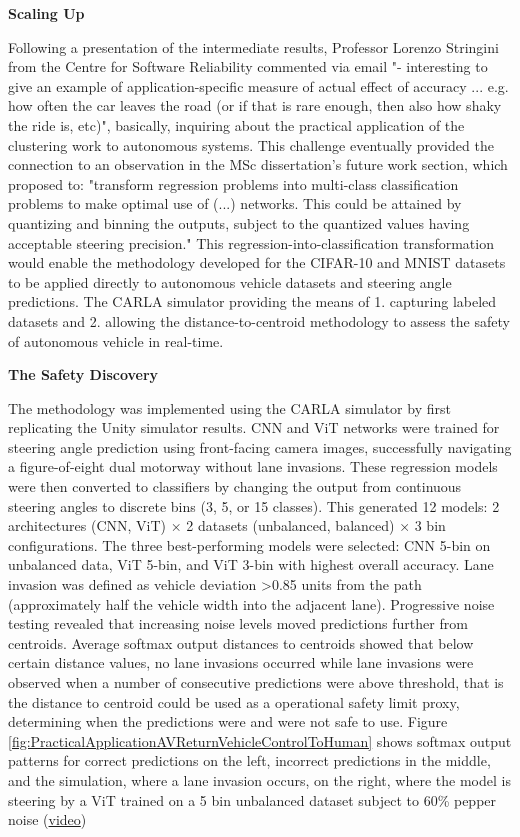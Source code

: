 \textbf{Scaling Up}

Following a presentation of the intermediate results, Professor Lorenzo Stringini from the Centre for Software Reliability commented via email "- interesting to give an example of application-specific measure of actual effect of accuracy ... e.g. how often the car leaves the road (or if that is rare enough, then also how shaky the ride is, etc)", basically, inquiring about the practical application of the clustering work to autonomous systems. This challenge eventually provided the connection to an observation in the MSc dissertation's future work section, which proposed to: "transform regression problems into multi-class classification problems to make optimal use of (...) networks. This could be attained by quantizing and binning the outputs, subject to the quantized values having acceptable steering precision."
This regression-into-classification transformation would enable the methodology developed for the CIFAR-10 and MNIST datasets to be applied directly to autonomous vehicle datasets and steering angle predictions. The CARLA simulator providing the means of 1. capturing labeled datasets and 2. allowing the distance-to-centroid methodology to assess the safety of autonomous vehicle in real-time.

\textbf{The Safety Discovery}

The methodology was implemented using the CARLA simulator by first replicating the Unity simulator results. CNN and ViT networks were trained for steering angle prediction using front-facing camera images, successfully navigating a figure-of-eight dual motorway without lane invasions. These regression models were then converted to classifiers by changing the output from continuous steering angles to discrete bins (3, 5, or 15 classes).
This generated 12 models: 2 architectures (CNN, ViT) × 2 datasets (unbalanced, balanced) × 3 bin configurations. The three best-performing models were selected: CNN 5-bin on unbalanced data, ViT 5-bin, and ViT 3-bin with highest overall accuracy.
Lane invasion was defined as vehicle deviation >0.85 units from the path (approximately half the vehicle width into the adjacent lane). Progressive noise testing revealed that increasing noise levels moved predictions further from centroids. Average softmax output distances to centroids showed that below certain distance values, no lane invasions occurred while lane invasions were observed when a number of consecutive predictions were above threshold, that is the distance to centroid could be used as a operational safety limit proxy, determining when the predictions were and were not safe to use. Figure \ref{fig:PracticalApplicationAVReturnVehicleControlToHuman} shows softmax output patterns for correct predictions on the left, incorrect predictions in the middle, and the simulation, where a lane invasion occurs, on the right, where the model is steering by a ViT trained on a 5 bin unbalanced dataset subject to 60\% pepper noise (\href{https://www.youtube.com/watch?v=OyENq7Xe88Q}{video})

